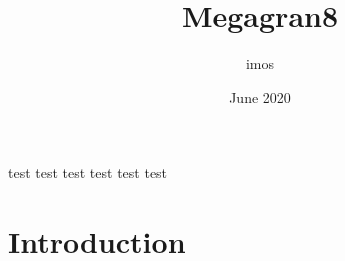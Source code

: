 \documentclass{article}
\title{Megagran8}
\author{imos }
\date{June 2020}
\begin{document}
\maketitle

test test test test test test

\section*{Introduction}
\end{document}

